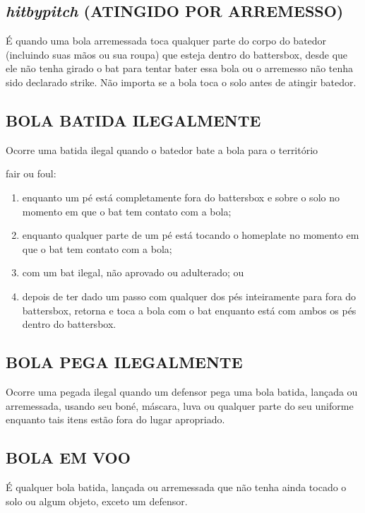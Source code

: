 \subsection{\textit{hitbypitch} (ATINGIDO POR ARREMESSO)}

É quando uma bola arremessada toca qualquer parte do corpo do batedor (incluindo suas mãos ou sua roupa) que esteja dentro do \gls{battersbox}, desde que ele não tenha girado o \gls{bat} para tentar bater essa bola ou o arremesso não tenha sido declarado \gls{strike}. Não importa se a bola toca o solo antes de atingir batedor.

\subsection{BOLA BATIDA ILEGALMENTE}
Ocorre uma batida ilegal quando o batedor bate a bola para o território

\gls{fair} ou \gls{foul}:
\begin{enumerate}[label=(\alph*)]
	\item   enquanto um pé está completamente fora do \gls{battersbox} e sobre o solo no momento em que o \gls{bat} tem contato com a bola;
	\item  enquanto qualquer parte de um pé está tocando o \gls{homeplate} no momento em que o \gls{bat} tem contato com a bola;
	\item  com um \gls{bat} ilegal, não aprovado ou adulterado; ou
	\item  depois de ter dado um passo com qualquer dos pés inteiramente para fora do \gls{battersbox}, retorna e toca a bola com o \gls{bat} enquanto está com ambos os pés dentro do \gls{battersbox}.
\end{enumerate}

\subsection{BOLA PEGA ILEGALMENTE}

Ocorre uma pegada ilegal quando um defensor pega uma bola batida, lançada ou arremessada, usando seu boné, máscara, luva ou qualquer parte do seu uniforme enquanto tais itens estão fora do lugar apropriado.

\subsection{BOLA EM VOO}

É qualquer bola batida, lançada ou arremessada que não tenha ainda tocado o solo ou algum objeto, exceto um defensor.

